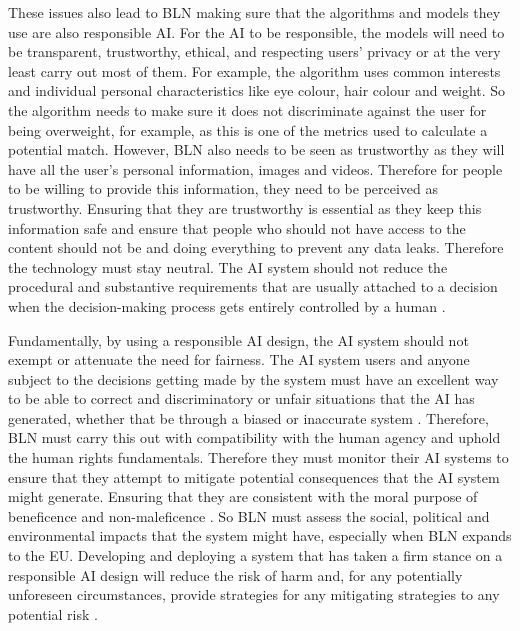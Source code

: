 \documentclass[a4paper,10pt]{article}
\begin{document}

These issues also lead to BLN making sure that the algorithms and models they use are also responsible AI. For the AI to be responsible, the models will need to be transparent, trustworthy, ethical, and respecting users' privacy \cite{berte_slides_ai_law_overview} or at the very least carry out most of them. For example, the algorithm uses common interests and individual personal characteristics like eye colour, hair colour and weight. So the algorithm needs to make sure it does not discriminate against the user for being overweight, for example, as this is one of the metrics used to calculate a potential match. However, BLN also needs to be seen as trustworthy as they will have all the user's personal information, images and videos. Therefore for people to be willing to provide this information, they need to be perceived as trustworthy. Ensuring that they are trustworthy is essential as they keep this information safe and ensure that people who should not have access to the content should not be and doing everything to prevent any data leaks. Therefore the technology must stay neutral. The AI system should not reduce the procedural and substantive requirements that are usually attached to a decision when the decision-making process gets entirely controlled by a human \cite{adam_slides_regulating_ai}.

Fundamentally, by using a responsible AI design, the AI system should not exempt or attenuate the need for fairness. The AI system users and anyone subject to the decisions getting made by the system must have an excellent way to be able to correct and discriminatory or unfair situations that the AI has generated, whether that be through a biased or inaccurate system \cite{adam_slides_regulating_ai}. Therefore, BLN must carry this out with compatibility with the human agency and uphold the human rights fundamentals. Therefore they must monitor their AI systems to ensure that they attempt to mitigate potential consequences that the AI system might generate. Ensuring that they are consistent with the moral purpose of beneficence and non-maleficence \cite{adam_slides_regulating_ai}. So BLN must assess the social, political and environmental impacts that the system might have, especially when BLN expands to the EU. Developing and deploying a system that has taken a firm stance on a responsible AI design will reduce the risk of harm and, for any potentially unforeseen circumstances, provide strategies for any mitigating strategies to any potential risk \cite{adam_slides_regulating_ai}.
\end{document}
